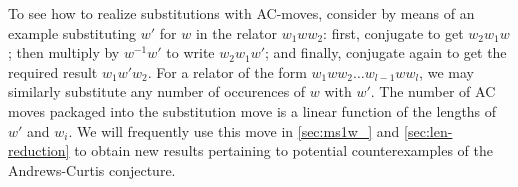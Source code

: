 To see how to realize substitutions with AC-moves, consider by means of an example substituting $w'$ for $w$ in the relator $w_1ww_2$: first, conjugate to get $w_2w_1w$; then multiply by $w^{-1}w'$ to write $w_2w_1w'$; and finally, conjugate again to get the required result $w_1w'w_2$. For a relator of the form $w_1 w w_2 \dots w_{l-1} w w_l$, we may similarly substitute any number of occurences of $w$ with $w'$. The number of AC moves packaged into the substitution move is a linear function of the lengths of $w'$ and $w_i$.
We will frequently use this move in \autoref{sec:ms1w_} and \autoref{sec:len-reduction} to obtain new results pertaining to potential counterexamples of the Andrews-Curtis conjecture.


